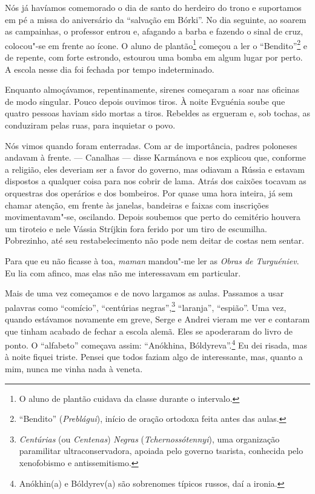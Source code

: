 Nós já havíamos comemorado o dia de santo do herdeiro do trono e
suportamos em pé a missa do aniversário da ``salvação em Bórki''. No dia
seguinte, ao soarem as campainhas, o professor entrou e, afagando a
barba e fazendo o sinal de cruz, colocou"-se em frente ao ícone. O aluno %
de plantão\footnote{O aluno de plantão cuidava da classe durante o
  intervalo.} começou a ler o ``Bendito''\footnote{``Bendito''
  (\emph{Preblágui}), início de oração ortodoxa feita antes das aulas.}
e de repente, com forte estrondo, estourou uma bomba em algum lugar por
perto. A escola nesse dia foi fechada por tempo indeterminado.

Enquanto almoçávamos, repentinamente, sirenes começaram a soar nas
oficinas de modo singular. Pouco depois ouvimos tiros. À noite Evguénia
soube que quatro pessoas haviam sido mortas a tiros. Rebeldes as
ergueram e, sob tochas, as conduziram pelas ruas, para inquietar o povo.

Nós vimos quando foram enterradas. Com ar de importância, padres
poloneses andavam à frente. --- Canalhas --- disse Karmánova e nos
explicou que, conforme a religião, eles deveriam ser a favor do governo,
mas odiavam a Rússia e estavam dispostos a qualquer coisa para nos
cobrir de lama. Atrás dos caixões tocavam as orquestras dos operários e
dos bombeiros. Por quase uma hora inteira, já sem chamar atenção, em
frente às janelas, bandeiras e faixas com inscrições movimentavam"-se,
oscilando. Depois soubemos que perto do cemitério houvera um tiroteio e
nele Vássia Stríjkin fora ferido por um tiro de escumilha. Pobrezinho,
até seu restabelecimento não pode nem deitar de costas nem sentar. %

Para que eu não ficasse à toa, \emph{maman} mandou"-me ler as \emph{Obras
de Turguéniev}. Eu lia com afinco, mas elas não me interessavam em
particular.

Mais de uma vez começamos e de novo largamos as aulas. Passamos a usar
palavras como ``comício'', ``centúrias negras'',\footnote{\emph{Centúrias}
  (ou \emph{Centenas}) \emph{Negras} (\emph{Tchernossótennyi}), uma organização paramilitar
  ultraconservadora, apoiada pelo governo tsarista, conhecida pelo
  xenofobismo e antissemitismo.} ``laranja'', ``espião''. Uma vez, quando
estávamos novamente em greve, Serge e Andrei vieram me ver e contaram
que tinham acabado de fechar a escola alemã. Eles se apoderaram do livro
de ponto. O ``alfabeto'' começava assim: ``Anókhina,
Bóldyreva''.\footnote{Anókhin(a) e Bóldyrev(a) são sobrenomes típicos
  russos, daí a ironia.} Eu dei risada, mas à noite fiquei triste.
Pensei que todos faziam algo de interessante, mas, quanto a mim, nunca
me vinha nada à veneta.

